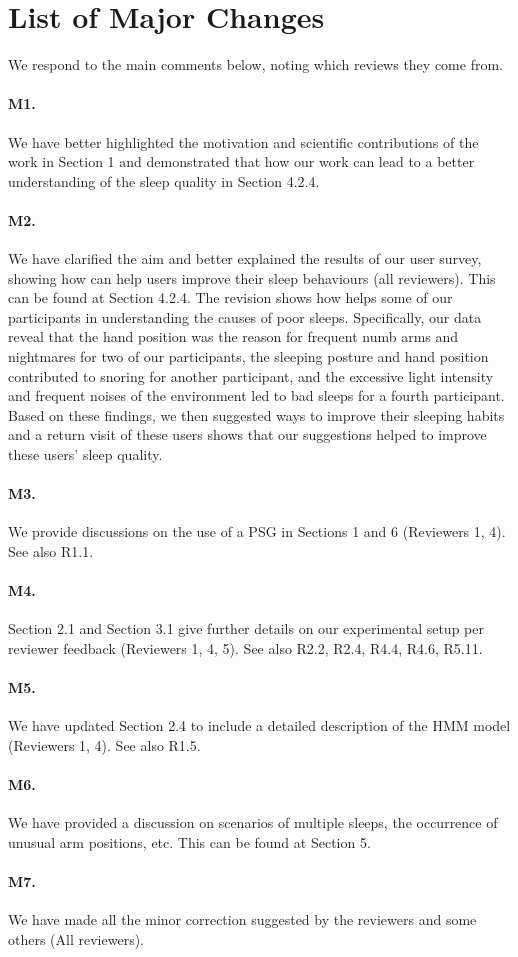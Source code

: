 \section*{List of Major Changes}

We respond to the main comments below, noting which reviews they come from.

\paragraph{M1.} We have better highlighted the motivation and scientific contributions of the work in Section 1 and demonstrated that how our work can lead to
a better understanding of the sleep quality in Section 4.2.4.

\paragraph{M2.} We have clarified the aim and better explained the results of our user survey, showing how \systemname can help users
improve their sleep behaviours (all reviewers). This can be found at Section 4.2.4. The revision shows how \systemname helps some of our
participants in understanding the causes of poor sleeps. Specifically, our data reveal that the hand position was the reason for frequent
numb arms and nightmares for two of our participants, the sleeping posture and hand position contributed to snoring for another
participant, and the excessive light intensity and frequent noises of the environment led to bad sleeps for a fourth participant. Based on
these findings, we then suggested ways to improve their sleeping habits and a return visit
of these users shows that our suggestions helped to improve these users' sleep quality.

\paragraph{M3.} We provide discussions on the use of a PSG in Sections 1 and 6 (Reviewers 1, 4). See also R1.1.

\paragraph{M4.} Section 2.1 and Section 3.1 give further details on our experimental setup per reviewer feedback (Reviewers 1, 4, 5). See also R2.2, R2.4, R4.4, R4.6, R5.11.

\paragraph{M5.} We have updated Section 2.4 to include a detailed description of the HMM model (Reviewers 1, 4). See also R1.5.


\paragraph{M6.} We have provided a discussion on scenarios of multiple sleeps, the occurrence of unusual arm positions, etc. This can be
found at Section 5.

\paragraph{M7.} We have made all the minor correction suggested by the reviewers and some others (All reviewers).
